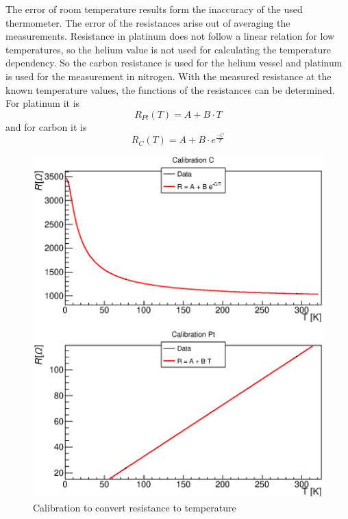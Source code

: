 \documentclass{article}
\begin{document}
The error of room temperature results form the inaccuracy of the used thermometer. 
The error of the resistances arise out of averaging the measurements.
Resistance in platinum does not follow a linear relation for low temperatures, so the helium value is not used for calculating the temperature dependency. 
So the carbon resistance is used for the helium vessel and platinum is used for the measurement in nitrogen.
With the measured resistance at the known temperature values, the functions of the resistances can be determined. 
For platinum it is
\begin{equation*}
    R_{Pt}(T)= A+ B\cdot T 
\end{equation*}
and for carbon it is 
\begin{equation*}
    R_C(T) = A + B\cdot e^{\frac{-C}{T}}
\end{equation*}
    \begin{figure}[H]
        \hspace{-0.5cm}
        \includegraphics[width=1.1\textwidth]{Graphen/calibration.eps}
        \caption{Calibration to convert resistance to temperature}
        \label{calib}
    \end{figure}
\end{document}
